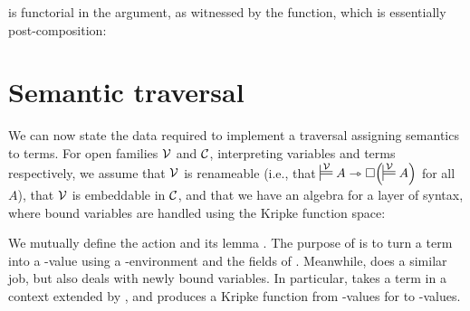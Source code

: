  is functorial in the \AgdaBound{$\C$} argument,
as witnessed by the  function, which is essentially
post-composition:




\section{Semantic traversal}\label{sec:traversal}

We can now state the data required to implement a traversal assigning
semantics to terms. For open families $\V$ and $\C$, interpreting
variables and terms respectively, we assume that $\V$ is renameable
(i.e., that $\sdtstile{}\V A \rightarrowtriangle \Box\plr{\sdtstile{}\V A}$ for
all $A$),
that $\V$ is embeddable in $\C$, and that we have an algebra for a
layer of syntax, where bound variables are handled using the Kripke
function space:




We mutually define the action  and its lemma
.
The purpose of  is to turn a term into a
\AgdaBound{$\C$}-value using a \AgdaBound{$\V$}-environment and the fields of
.
Meanwhile,  does a similar job, but also deals with
newly bound variables.
In particular,  takes a term in a context extended by
\AgdaBound{$\Theta$}, and produces a Kripke function from
\AgdaBound{$\V$}-values for \AgdaBound{$\Theta$} to \AgdaBound{$\C$}-values.

